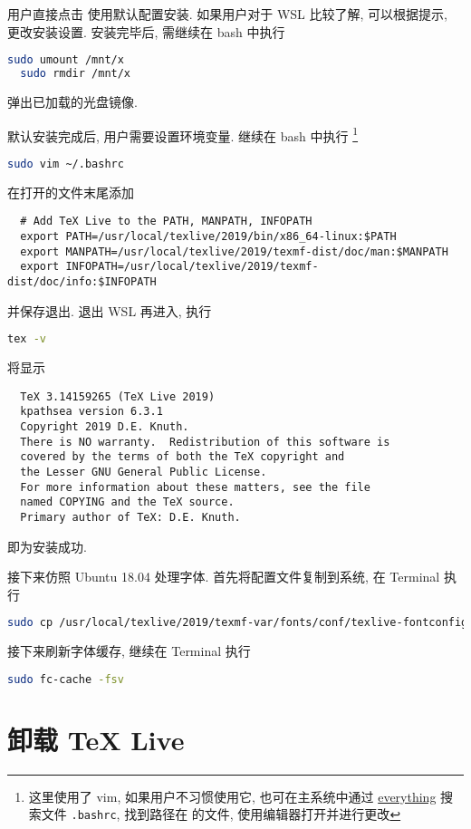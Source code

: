 用户直接点击  使用默认配置安装.
如果用户对于 WSL 比较了解, 可以根据提示, 更改安装设置.
安装完毕后, 需继续在 \textsf{bash} 中执行
\begin{lstlisting}[language = bash]
  sudo umount /mnt/x
  sudo rmdir /mnt/x
\end{lstlisting}
弹出已加载的光盘镜像.

默认安装完成后, 用户需要设置环境变量.
继续在 \textsf{bash} 中执行%
\footnote{这里使用了 vim,
如果用户不习惯使用它, 也可在主系统中通过
\href{https://www.voidtools.com/zh-cn/}{everything}
搜索文件 \texttt{.bashrc}, 找到路径在
的文件, 使用编辑器打开并进行更改}%
\begin{lstlisting}[language = bash]
  sudo vim ~/.bashrc
\end{lstlisting}
在打开的文件末尾添加
\begin{lstlisting}
  # Add TeX Live to the PATH, MANPATH, INFOPATH
  export PATH=/usr/local/texlive/2019/bin/x86_64-linux:$PATH
  export MANPATH=/usr/local/texlive/2019/texmf-dist/doc/man:$MANPATH
  export INFOPATH=/usr/local/texlive/2019/texmf-dist/doc/info:$INFOPATH
\end{lstlisting}
并保存退出.
退出 WSL 再进入, 执行
\begin{lstlisting}[language=bash]
  tex -v
\end{lstlisting}
将显示
\begin{lstlisting}
  TeX 3.14159265 (TeX Live 2019)
  kpathsea version 6.3.1
  Copyright 2019 D.E. Knuth.
  There is NO warranty.  Redistribution of this software is
  covered by the terms of both the TeX copyright and
  the Lesser GNU General Public License.
  For more information about these matters, see the file
  named COPYING and the TeX source.
  Primary author of TeX: D.E. Knuth.
\end{lstlisting}
即为安装成功.

接下来仿照 Ubuntu 18.04 处理字体.
首先将配置文件复制到系统,
在 \textsf{Terminal} 执行
\begin{lstlisting}[language=bash]
  sudo cp /usr/local/texlive/2019/texmf-var/fonts/conf/texlive-fontconfig.conf /etc/fonts/conf.d/09-texlive.conf
\end{lstlisting}
接下来刷新字体缓存,
继续在 \textsf{Terminal} 执行
\begin{lstlisting}[language=bash]
  sudo fc-cache -fsv
\end{lstlisting}

\section{卸载 \TeX{} Live}

